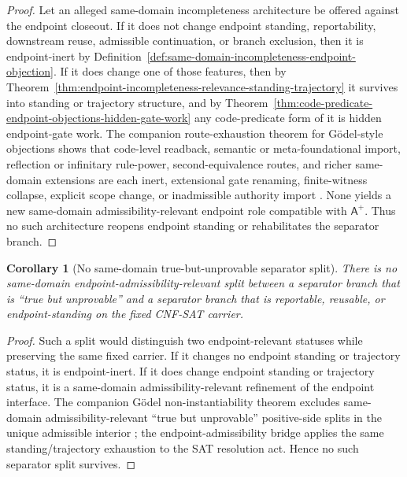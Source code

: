 \documentclass[11pt]{article}
\newtheorem{corollary}[theorem]{Corollary}
\theoremstyle{definition}
\theoremstyle{remark}
\newcommand{\Aplus}{\mathsf{A}^{+}}
\begin{document}
\begin{proof}
Let an alleged same-domain incompleteness architecture be offered against the endpoint closeout. If it does not change endpoint standing, reportability, downstream reuse, admissible continuation, or branch exclusion, then it is endpoint-inert by Definition~\ref{def:same-domain-incompleteness-endpoint-objection}. If it does change one of those features, then by Theorem~\ref{thm:endpoint-incompleteness-relevance-standing-trajectory} it survives into standing or trajectory structure, and by Theorem~\ref{thm:code-predicate-endpoint-objections-hidden-gate-work} any code-predicate form of it is hidden endpoint-gate work. The companion route-exhaustion theorem for G\"odel-style objections shows that code-level readback, semantic or meta-foundational import, reflection or infinitary rule-power, second-equivalence routes, and richer same-domain extensions are each inert, extensional gate renaming, finite-witness collapse, explicit scope change, or inadmissible authority import \cite{GodelNonInstantiability}. None yields a new same-domain admissibility-relevant endpoint role compatible with \(\Aplus\). Thus no such architecture reopens endpoint standing or rehabilitates the separator branch.
\end{proof}

\begin{corollary}[No same-domain true-but-unprovable separator split]\label{cor:no-true-but-unprovable-separator-split}
There is no same-domain endpoint-admissibility-relevant split between a separator branch that is ``true but unprovable'' and a separator branch that is reportable, reusable, or endpoint-standing on the fixed CNF-SAT carrier.
\end{corollary}

\begin{proof}
Such a split would distinguish two endpoint-relevant statuses while preserving the same fixed carrier. If it changes no endpoint standing or trajectory status, it is endpoint-inert. If it does change endpoint standing or trajectory status, it is a same-domain admissibility-relevant refinement of the endpoint interface. The companion G\"odel non-instantiability theorem excludes same-domain admissibility-relevant ``true but unprovable'' positive-side splits in the unique admissible interior \cite{GodelNonInstantiability}; the endpoint-admissibility bridge applies the same standing/trajectory exhaustion to the SAT resolution act. Hence no such separator split survives.
\end{proof}
\end{document}
